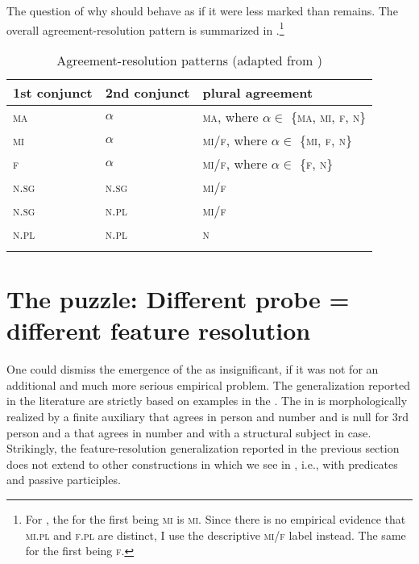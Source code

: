 \documentclass[output=paper,modfontsnewtxmath,hidelinks]{langscibook}
\begin{document}
\noindent The question of why   should behave as if it were less marked than   remains. The overall agreement-resolution pattern is summarized in .\footnote{For \citet{Panevova1997}, the  for the first  being \textsc{mi} is \textsc{mi}. Since there is no empirical evidence that \textsc{mi.pl} and \textsc{f.pl} are distinct, I use the descriptive \textsc{mi/f} label instead. The same for the first  being \textsc{f}.}

\begin{table}
\caption{Agreement-resolution patterns (adapted from \citealt{Panevova1997})}
\label{PPtable}
\begin{tabularx}{0.8\textwidth}{llX}
\lsptoprule
\textbf{1st conjunct} & \textbf{2nd conjunct} & \textbf{{plural} agreement} \\\midrule
\textsc{ma} & $\alpha$ & \textsc{ma}, where $\alpha \in$ \{\textsc{ma, mi, f, n}\}\\
\textsc{mi} & $\alpha$ & \textsc{mi/f}, where $\alpha \in$ \{\textsc{mi, f, n}\}\\
\textsc{f} & $\alpha$ & \textsc{mi/f}, where $\alpha \in$ \{\textsc{f, n}\}\\
\textsc{n.sg} & \textsc{n.sg} & \textsc{mi/f}\\
\textsc{n.sg} & \textsc{n.pl} & \textsc{mi/f}\\
\textsc{n.pl} & \textsc{n.pl} & \textsc{n}\\\lspbottomrule
\end{tabularx}
\end{table}

\section{The puzzle: Different probe = different feature resolution}\label{sec:puzzle}

One could dismiss the emergence of the    as insignificant, if it was not for an additional and much more serious empirical problem. The generalization reported in the literature are strictly based on examples in the . The  in  is morphologically realized by a finite auxiliary that agrees in person and number and is null for 3rd person and a   that agrees in number and  with a structural subject in  case. Strikingly, the feature-resolution generalization reported in the previous section does not extend to other constructions in which we see  in , i.e.,  with  predicates and passive participles. 
\end{document}

